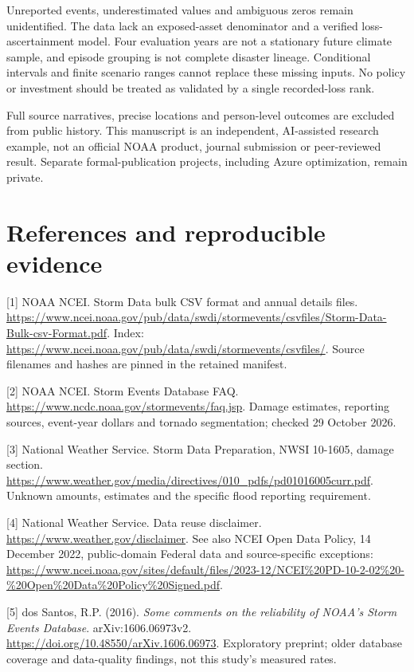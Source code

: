 \documentclass[11pt,letterpaper]{article}
\begin{document}
Unreported events, underestimated values and ambiguous zeros remain unidentified. The data lack an exposed-asset denominator and a verified loss-ascertainment model. Four evaluation years are not a stationary future climate sample, and episode grouping is not complete disaster lineage. Conditional intervals and finite scenario ranges cannot replace these missing inputs. No policy or investment should be treated as validated by a single recorded-loss rank.

Full source narratives, precise locations and person-level outcomes are excluded from public history. This manuscript is an independent, AI-assisted research example, not an official NOAA product, journal submission or peer-reviewed result. Separate formal-publication projects, including Azure optimization, remain private.

\newpage
\section*{References and reproducible evidence}
\small
[1] NOAA NCEI. Storm Data bulk CSV format and annual details files. \url{https://www.ncei.noaa.gov/pub/data/swdi/stormevents/csvfiles/Storm-Data-Bulk-csv-Format.pdf}. Index: \url{https://www.ncei.noaa.gov/pub/data/swdi/stormevents/csvfiles/}. Source filenames and hashes are pinned in the retained manifest.

[2] NOAA NCEI. Storm Events Database FAQ. \url{https://www.ncdc.noaa.gov/stormevents/faq.jsp}. Damage estimates, reporting sources, event-year dollars and tornado segmentation; checked 29 October 2026.

[3] National Weather Service. Storm Data Preparation, NWSI 10-1605, damage section. \url{https://www.weather.gov/media/directives/010_pdfs/pd01016005curr.pdf}. Unknown amounts, estimates and the specific flood reporting requirement.

[4] National Weather Service. Data reuse disclaimer. \url{https://www.weather.gov/disclaimer}. See also NCEI Open Data Policy, 14 December 2022, public-domain Federal data and source-specific exceptions: \url{https://www.ncei.noaa.gov/sites/default/files/2023-12/NCEI%20PD-10-2-02%20-%20Open%20Data%20Policy%20Signed.pdf}.

[5] dos Santos, R.P. (2016). \emph{Some comments on the reliability of NOAA's Storm Events Database}. arXiv:1606.06973v2. \url{https://doi.org/10.48550/arXiv.1606.06973}. Exploratory preprint; older database coverage and data-quality findings, not this study's measured rates.
\end{document}
